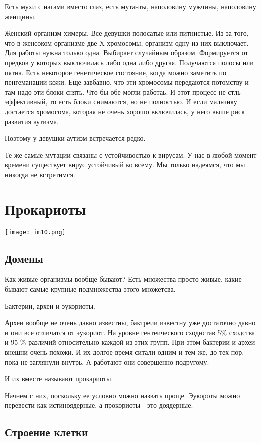 Есть мухи с нагами вместо глаз, 
есть мутанты, наполовину мужчины, наполовину женщины. 

Женский организм химеры. Все девушки полосатые или питнистые. Из-за того, 
что в женсоком организме две X хромосомы, организм одну из них выключает. Для 
работы нужна только одна. Выбирает случайным образом. Формируется от предков у которых 
выключилась либо одна либо другая. Получаются полосы или пятна. 
Есть некоторое генетическое состояние, когда можно заметить по пенгеманации кожи. 
Еще завбавно, что эти хромосомы передаются потомству и там 
надо эти блоки снять. Что бы обе могли работаь. И этот 
процесс не стль эффективный, то есть блоки снимаются, но не полностью. 
И если мальчику достается хромосома, которая не очень хорошо включилась, 
у него выше риск развития аутизма. 

Поэтому у девушки аутизм встречается редко. 

Те же самые мутации связаны с устойчивостью к вирусам. У нас в любой момент 
времени существует вирус устойчивый ко всему. Мы только надеямся, что мы никогда не встретимся. 

\section{Прокариоты} 
\texttt{[image: im10.png]}
\subsection{Домены}
Как живые организмы вообще бывают? 
Есть множества просто живые, какие бывают самые крупные подмножества 
этого множетсва. 

Бактерии, археи и эукориоты. 

Археи вообще не очень давно известны, бактреии известну уже 
достаточно давно и они все отличатся от эукориот. На уровне 
гентеического сходнстав 5\% сходства и 95 \% различий относительно каждой из этих 
групп. При этом бактерии и археи внешни очень похожи. И их 
долгое время ситали одним и тем же, до тех пор, 
пока не заглянули внутрь. А работают они совершенно подругому. 

И их вместе называют прокариоты. 

Начнем с них, поскольку ее условно можно назвать проще. Эукороты 
можно перевести как истиноядерные, а прокориоты - это доядерные. 

\subsection{Строение клетки}

